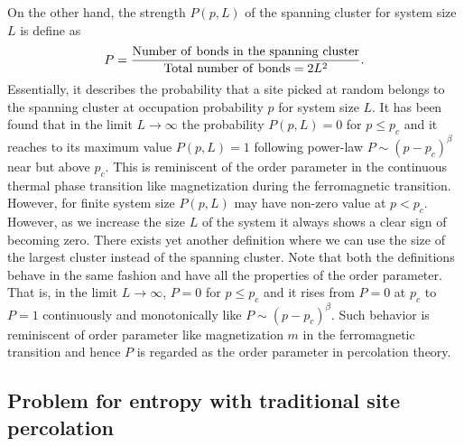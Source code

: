 	On the other hand, the strength $P(p,L)$ of the spanning cluster for system size $L$
	is define as 
	\begin{equation}
	\label{eq:pp1}
	P={{{\rm Number \ of \ bonds \ in \ the \ spanning \ cluster}}\over{{\rm Total \ 
				number \ of \ bonds }=2L^2}}.
	\end{equation}
	Essentially, it describes the probability that a site 
	picked at random belongs to the spanning cluster at occupation probability $p$ for system size $L$.
	It has been found that in the limit $L\rightarrow \infty$ the probability $P(p,L)=0$ 
	for $p\leq p_c$ and it reaches to its maximum value $P(p,L)=1$ 
	following power-law $P\sim (p-p_c)^\beta$ near but above $p_c$. This is reminiscent 
	of the order parameter in the continuous thermal phase transition like magnetization
	during the ferromagnetic transition.  However, for finite system size $P(p,L)$ may have non-zero
	value at $p<p_c$. However, as we increase the size $L$ of the system it always shows a clear sign
	of becoming zero. There exists yet another definition where 
	we can use the size of the largest cluster instead of the spanning cluster. Note that both the definitions 
	behave in the same fashion and have all the properties of the order parameter. That is,  
	in the limit $L\rightarrow \infty$, 
	$P=0$ for $p\leq p_c$ and it rises from $P=0$ at $p_c$ to $P=1$ continuously and monotonically like $P\sim (p-p_c)^\beta$. 
	Such behavior is reminiscent of order parameter like magnetization $m$ in the ferromagnetic transition and
	hence $P$ is regarded as the order parameter in percolation theory. 
	
	
	\subsection{Problem for entropy with traditional site percolation}
	

